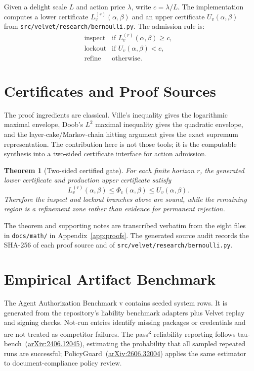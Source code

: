 \documentclass[11pt]{article}
\newtheorem{theorem}{Theorem}
\begin{document}
Given a delight scale $L$ and action price $\lambda$, write $c=\lambda/L$. The implementation computes a lower certificate $L_v^{(r)}(\alpha,\beta)$ and an upper certificate $U_v(\alpha,\beta)$ from \texttt{src/velvet/research/bernoulli.py}. The admission rule is:
\[
\begin{array}{ll}
\text{inspect} & \text{if } L_v^{(r)}(\alpha,\beta)\geq c,\\
\text{lockout} & \text{if } U_v(\alpha,\beta)<c,\\
\text{refine} & \text{otherwise.}
\end{array}
\]

\section{Certificates and Proof Sources}

The proof ingredients are classical. Ville's inequality gives the logarithmic maximal envelope, Doob's $L^2$ maximal inequality gives the quadratic envelope, and the layer-cake/Markov-chain hitting argument gives the exact supremum representation. The contribution here is not those tools; it is the computable synthesis into a two-sided certificate interface for action admission.

\begin{theorem}[Two-sided certified gate]
For each finite horizon $r$, the generated lower certificate and production upper certificate satisfy
\[
    L_v^{(r)}(\alpha,\beta)\leq \Phi_v(\alpha,\beta)\leq U_v(\alpha,\beta).
\]
Therefore the inspect and lockout branches above are sound, while the remaining region is a refinement zone rather than evidence for permanent rejection.
\end{theorem}

The theorem and supporting notes are transcribed verbatim from the eight files in \texttt{docs/math/} in Appendix~\ref{app:proofs}. The generated source audit records the SHA-256 of each proof source and of \texttt{src/velvet/research/bernoulli.py}.

\section{Empirical Artifact Benchmark}

The Agent Authorization Benchmark v\BenchmarkVersion{} contains \BenchmarkSystemCount{} seeded system rows. It is generated from the repository's liability benchmark adapters plus Velvet replay and signing checks. Not-run entries identify missing packages or credentials and are not treated as competitor failures. The pass\textsuperscript{k} reliability reporting follows tau-bench~(\href{https://arxiv.org/abs/2406.12045}{arXiv:2406.12045}), estimating the probability that all sampled repeated runs are successful; PolicyGuard~(\href{https://arxiv.org/abs/2606.32004}{arXiv:2606.32004}) applies the same estimator to document-compliance policy review.
\end{document}
